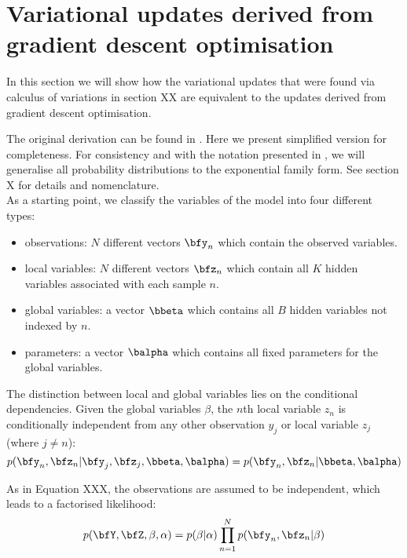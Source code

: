 \section{Variational updates derived from gradient descent optimisation}

In this section we will show how the variational updates that were found via calculus of variations in section XX are equivalent to the updates derived from gradient descent optimisation. 

The original derivation can be found in \cite{hoffmann}. Here we present simplified version for completeness. For consistency and with the notation presented in \cite{hoffmann}, we will generalise all probability distributions to the exponential family form. See section X for details and nomenclature.\\

As a starting point, we classify the variables of the model into four different types:
\begin{itemize}
	\itemsep-1.5em 
	\item observations: $N$ different vectors $\bfy_{n}$ which contain the observed variables. \\
	\item local variables: $N$ different vectors $\bfz_{n}$ which contain all $K$ hidden variables associated with each sample $n$. \\
	\item global variables: a vector $\bbeta$ which contains all $B$ hidden variables not indexed by $n$. \\
	\item parameters: a vector $\balpha$ which contains all fixed parameters for the global variables.
\end{itemize}
The distinction between local and global variables lies on the conditional dependencies. Given the global variables $\beta$, the $n$th local variable $z_n$ is conditionally independent from any other observation $y_{j}$ or local variable $z_{j}$ (where $j \neq n$):
\[
p(\bfy_n,\bfz_n| \bfy_j,\bfz_j,\bbeta,\balpha) = p(\bfy_n,\bfz_n|\bbeta,\balpha)
\]

As in Equation XXX, the observations are assumed to be independent, which leads to a factorised likelihood:
\[
p(\bfY,\bfZ,\beta,\alpha) = p(\beta|\alpha) \prod_{n=1}^{N} p(\bfy_n,\bfz_n|\beta)
\]


